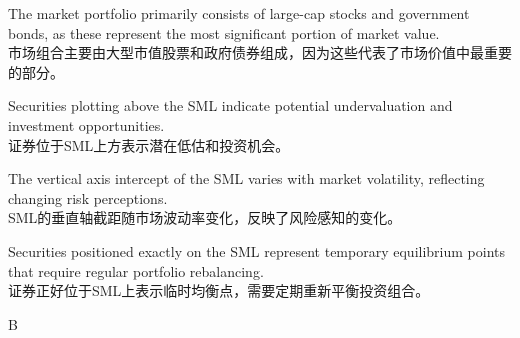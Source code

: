 \documentclass{article}
\begin{document}
\begin{choices}
    \item The market portfolio primarily consists of large-cap stocks and government bonds, as these represent the most significant portion of market value.
    \\
    市场组合主要由大型市值股票和政府债券组成，因为这些代表了市场价值中最重要的部分。
    \item Securities plotting above the SML indicate potential undervaluation and investment opportunities.
    \\
    证券位于SML上方表示潜在低估和投资机会。
    \item The vertical axis intercept of the SML varies with market volatility, reflecting changing risk perceptions.
    \\
    SML的垂直轴截距随市场波动率变化，反映了风险感知的变化。
    \item Securities positioned exactly on the SML represent temporary equilibrium points that require regular portfolio rebalancing.
    \\
    证券正好位于SML上表示临时均衡点，需要定期重新平衡投资组合。
\end{choices}

\begin{correctanswer}
    B
\end{correctanswer}
\end{document}
